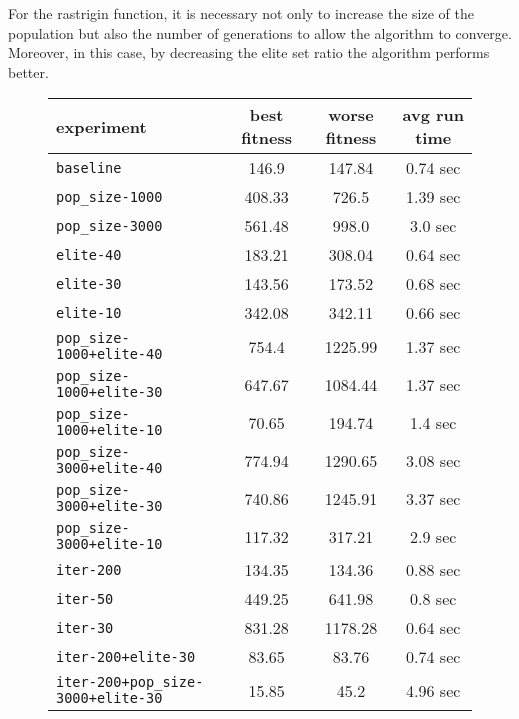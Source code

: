 For the rastrigin function, it is necessary not only to increase the size of the population but also the number of generations to allow the algorithm to converge. Moreover, in this case, by decreasing the elite set ratio the algorithm performs better.  

\begin{figure}[htb]
	\centering
	
	\begin{tabular}{lccc}
		\toprule
		\textbf{experiment} & \textbf{best fitness} & \textbf{worse fitness} & \textbf{avg run time} \\
		\midrule
		\texttt{baseline 						}		 &	 146.9 &	 147.84 &	  0.74 sec \\
		\texttt{pop\_size-1000 					}			   &	408.33 &	  726.5 &	  1.39 sec \\
		\texttt{pop\_size-3000 					}			   &	561.48 &	  998.0 &	   3.0 sec \\
		\texttt{elite-40 						}		 &	183.21 &	 308.04 &	  0.64 sec \\
		\texttt{elite-30 						}		 &	143.56 &	 173.52 &	  0.68 sec \\
		\texttt{elite-10 						}		 &	342.08 &	 342.11 &	  0.66 sec \\
		\texttt{pop\_size-1000+elite-40 		}	  &	 754.4 &	1225.99 &	  1.37 sec \\
		\texttt{pop\_size-1000+elite-30 		}	  &	647.67 &	1084.44 &	  1.37 sec \\
		\texttt{pop\_size-1000+elite-10 		}	  &	 70.65 &	 194.74 &	   1.4 sec \\
		\texttt{pop\_size-3000+elite-40 		}	  &	774.94 &	1290.65 &	  3.08 sec \\
		\texttt{pop\_size-3000+elite-30 		}	  &	740.86 &	1245.91 &	  3.37 sec \\
		\texttt{pop\_size-3000+elite-10 		}	  &	117.32 &	 317.21 &	   2.9 sec \\
		\texttt{iter-200 						}	 &	134.35 &	 134.36 &	  0.88 sec \\
		\texttt{iter-50 						}	  &	449.25 &	 641.98 &	   0.8 sec \\
		\texttt{iter-30 						}	  &	831.28 &	1178.28 &	  0.64 sec \\
		\texttt{iter-200+elite-30 				}	 &	 83.65 &	  83.76 &	  0.74 sec \\
		\texttt{iter-200+pop\_size-3000+elite-30} 	&	 15.85 &	   45.2 &	  4.96 sec \\
		\bottomrule
	\end{tabular}
	\label{tab:cem-performance-r}
\end{figure}
\bigskip

